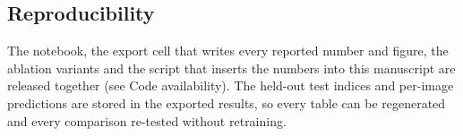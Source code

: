 \subsection{Reproducibility}
The notebook, the export cell that writes every reported number and figure, the ablation variants and the script that
inserts the numbers into this manuscript are released together (see Code availability). The held-out test indices and
per-image predictions are stored in the exported results, so every table can be regenerated and every comparison
re-tested without retraining.
